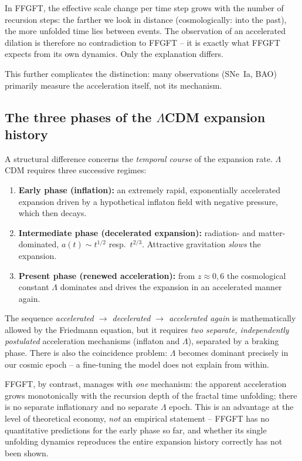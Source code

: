 In FFGFT, the effective scale change per time step grows with the number of
recursion steps: the farther we look in distance (cosmologically: into the
past), the more unfolded time lies between events. The observation of an
accelerated dilation is therefore no contradiction to FFGFT -- it is exactly
what FFGFT expects from its own dynamics. Only the explanation differs.

This further complicates the distinction: many observations (SNe~Ia, BAO)
primarily measure the acceleration itself, not its mechanism.

\subsection*{The three phases of the $\Lambda$CDM expansion history}

A structural difference concerns the \emph{temporal course} of the
expansion rate. $\Lambda$CDM requires three successive regimes:

\begin{enumerate}
  \item \textbf{Early phase (inflation):} an extremely rapid, exponentially
        accelerated expansion driven by a hypothetical inflaton field with
        negative pressure, which then decays.
  \item \textbf{Intermediate phase (decelerated expansion):} radiation- and
        matter-dominated, $a(t) \sim t^{1/2}$ resp.\ $t^{2/3}$. Attractive
        gravitation \emph{slows} the expansion.
  \item \textbf{Present phase (renewed acceleration):} from $z \approx 0{,}6$
        the cosmological constant $\Lambda$ dominates and drives the
        expansion in an accelerated manner again.
\end{enumerate}

The sequence \emph{accelerated $\to$ decelerated $\to$ accelerated again} is
mathematically allowed by the Friedmann equation, but it requires \emph{two
separate, independently postulated} acceleration mechanisms (inflaton and
$\Lambda$), separated by a braking phase. There is also the coincidence
problem: $\Lambda$ becomes dominant precisely in our cosmic epoch -- a
fine-tuning the model does not explain from within.

FFGFT, by contrast, manages with \emph{one} mechanism: the apparent
acceleration grows monotonically with the recursion depth of the fractal
time unfolding; there is no separate inflationary and no separate $\Lambda$
epoch. This is an advantage at the level of theoretical economy, \emph{not}
an empirical statement -- FFGFT has no quantitative predictions for the
early phase so far, and whether its single unfolding dynamics reproduces the
entire expansion history correctly has not been shown.

